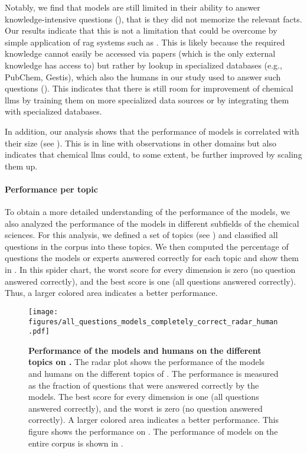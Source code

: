 \documentclass[11pt, oneside]{article}
\begin{document}
\begin{refsection}
Notably, we find that models are still limited in their ability to answer knowledge-intensive questions (), that is they did not memorize the relevant facts. Our results indicate that this is not a limitation that could be overcome by simple application of \gls{rag} systems such as \PaperQATwo. This is likely because the required knowledge cannot easily be accessed via papers (which is the only external knowledge \PaperQATwo has access to) but rather by lookup in specialized databases (e.g., PubChem, Gestis), which also the humans in our study used to answer such questions ().
This indicates that there is still room for improvement of chemical \glspl{llm} by training them on more specialized data sources or by integrating them with specialized databases.

In addition, our analysis shows that the performance of models is correlated with their size (see ). This is in line with observations in other domains but also indicates that chemical \glspl{llm} could, to some extent, be further improved by scaling them up.

\paragraph{Performance per topic} To obtain a more detailed understanding of the performance of the models, we also analyzed the performance of the models in different subfields of the chemical sciences.
For this analysis, we defined a set of topics (see ) and  classified all questions in the \chembench corpus into these topics.
We then computed the percentage of questions the models or experts answered correctly for each topic and show them in .
In this spider chart, the worst score for every dimension is zero (no question answered correctly), and the best score is one (all questions answered correctly). Thus, a larger colored area indicates a better performance.

\begin{figure}[!h]
    \centering
    \texttt{[image: figures/all\_questions\_models\_completely\_correct\_radar\_human.pdf]}
    \caption{\textbf{Performance of the models and humans on the different topics on \chembenchmini.} The radar plot shows the performance of the models and humans on the different topics of \chembenchmini. The performance is measured as the fraction of questions that were answered correctly by the models.
    The best score for every dimension is one (all questions answered correctly), and the worst is zero (no question answered correctly). A larger colored area indicates a better performance.
    This figure shows the performance on \chembenchmini. The performance of models on the entire corpus is shown in .
    }
    \label{fig:all_questions_models_completely_correct_radar_human}
\end{figure}


\end{refsection}
\end{document}
